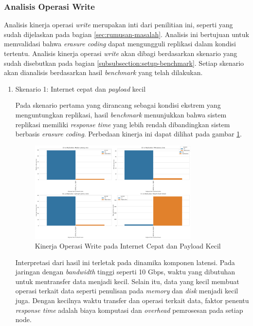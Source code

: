 \subsubsection{Analisis Operasi Write}
\label{subsubsection:analisis-operasi-write}

Analisis kinerja operasi \textit{write} merupakan inti dari penilitian ini, seperti yang sudah dijelaskan pada bagian \ref{sec:rumusan-masalah}. Analisis ini bertujuan untuk memvalidasi bahwa \textit{erasure coding} dapat mengungguli replikasi dalam kondisi tertentu. Analisis kinerja operasi \textit{write} akan dibagi berdasarkan skenario yang sudah disebutkan pada bagian \ref{subsubsection:setup-benchmark}. Setiap skenario akan dianalisis berdasarkan hasil \textit{benchmark} yang telah dilakukan.

\begin{enumerate}
  \item Skenario 1: Internet cepat dan \textit{payload} kecil

  Pada skenario pertama yang dirancang sebagai kondisi ekstrem yang menguntungkan replikasi, hasil \textit{benchmark} menunjukkan bahwa sistem replikasi memiliki \textit{response time} yang lebih rendah dibandingkan sistem berbasis \textit{erasure coding}. Perbedaan kinerja ini dapat dilihat pada gambar \ref{fig:write-smload-fastnet}.

  \begin{figure}[ht]
      \centering
      \includegraphics[width=0.8\textwidth]{resources/chapter-4/write_smload_fastnet.png}

      \caption{Kinerja Operasi Write pada Internet Cepat dan Payload Kecil}
      \label{fig:write-smload-fastnet}
  \end{figure}
  
  Interpretasi dari hasil ini terletak pada dinamika komponen latensi. Pada jaringan dengan \textit{bandwidth} tinggi seperti 10 Gbps, waktu yang dibutuhan untuk mentransfer data menjadi kecil. Selain itu, data yang kecil membuat operasi terkait data seperti penulisan pada \textit{memory} dan \textit{disk} menjadi kecil juga. Dengan kecilnya waktu transfer dan operasi terkait data, faktor penentu \textit{response time} adalah biaya komputasi dan \textit{overhead} pemrosesan pada setiap node.


\end{enumerate}
